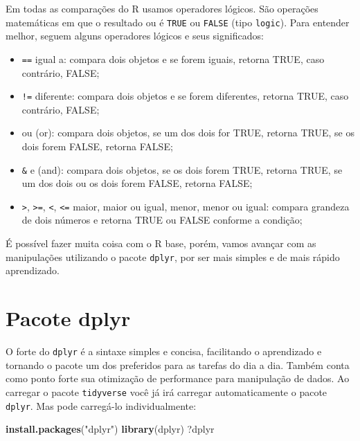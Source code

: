 \documentclass[]{book}
\newenvironment{Shaded}{\begin{snugshade}}{\end{snugshade}}
\newcommand{\KeywordTok}[1]{\textcolor[rgb]{0.13,0.29,0.53}{\textbf{#1}}}
\newcommand{\StringTok}[1]{\textcolor[rgb]{0.31,0.60,0.02}{#1}}
\newcommand{\NormalTok}[1]{#1}
\providecommand{\tightlist}{%
  \setlength{\itemsep}{0pt}\setlength{\parskip}{0pt}}
\begin{document}
Em todas as comparações do R usamos operadores lógicos. São operações
matemáticas em que o resultado ou é \texttt{TRUE} ou \texttt{FALSE}
(tipo \texttt{logic}). Para entender melhor, seguem alguns operadores
lógicos e seus significados:

\begin{itemize}
\tightlist
\item
  \texttt{==} igual a: compara dois objetos e se forem iguais, retorna
  TRUE, caso contrário, FALSE;
\item
  \texttt{!=} diferente: compara dois objetos e se forem diferentes,
  retorna TRUE, caso contrário, FALSE;
\item
  \texttt{\textbar{}} ou (or): compara dois objetos, se um dos dois for
  TRUE, retorna TRUE, se os dois forem FALSE, retorna FALSE;
\item
  \texttt{\&} e (and): compara dois objetos, se os dois forem TRUE,
  retorna TRUE, se um dos dois ou os dois forem FALSE, retorna FALSE;
\item
  \texttt{\textgreater{}}, \texttt{\textgreater{}=},
  \texttt{\textless{}}, \texttt{\textless{}=} maior, maior ou igual,
  menor, menor ou igual: compara grandeza de dois números e retorna TRUE
  ou FALSE conforme a condição;
\end{itemize}

É possível fazer muita coisa com o R base, porém, vamos avançar com as
manipulações utilizando o pacote \texttt{dplyr}, por ser mais simples e
de mais rápido aprendizado.

\section{Pacote dplyr}\label{pacote-dplyr}

O forte do \texttt{dplyr} é a sintaxe simples e concisa, facilitando o
aprendizado e tornando o pacote um dos preferidos para as tarefas do dia
a dia. Também conta como ponto forte sua otimização de performance para
manipulação de dados. Ao carregar o pacote \texttt{tidyverse} você já
irá carregar automaticamente o pacote \texttt{dplyr}. Mas pode
carregá-lo individualmente:

\begin{Shaded}
\begin{Highlighting}[]
\KeywordTok{install.packages}\NormalTok{(}\StringTok{"dplyr"}\NormalTok{)}
\KeywordTok{library}\NormalTok{(dplyr)}
\NormalTok{?dplyr}
\end{Highlighting}
\end{Shaded}
\end{document}
